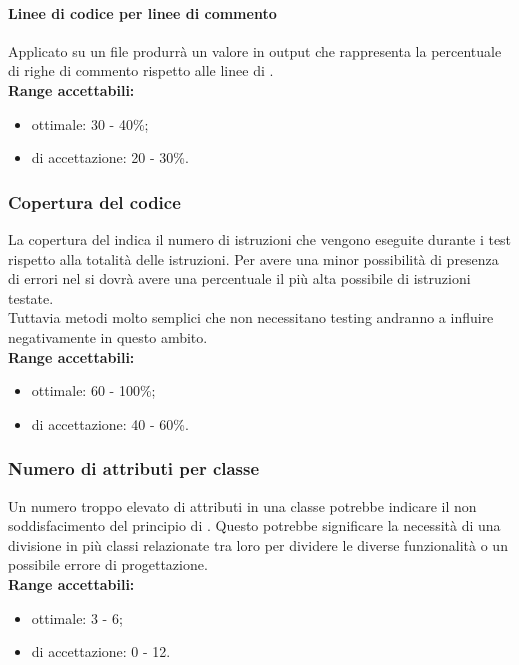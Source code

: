 \documentclass{scalatekids-article}
\begin{document}
\paragraph{Linee di codice per linee di commento}
Applicato su un file produrrà un valore in output che rappresenta la percentuale di righe di commento rispetto alle linee di .\\
\textbf{Range accettabili:}
\begin{itemize}
  \item {} ottimale: 30 - 40\%;
  \item {} di accettazione: 20 - 30\%.
\end{itemize}
\subsubsection{Copertura del codice}
La copertura del  indica il numero di istruzioni che vengono eseguite durante i test rispetto alla totalità delle istruzioni. Per avere una minor possibilità di presenza di errori nel  si dovrà avere una percentuale il più alta possibile di istruzioni testate.\\Tuttavia metodi molto semplici che non necessitano testing andranno a influire negativamente in questo ambito.\\
\textbf{Range accettabili:}
\begin{itemize}
  \item {} ottimale: 60 - 100\%;
  \item {} di accettazione: 40 - 60\%.
\end{itemize}
\subsubsection{Numero di attributi per classe}
Un numero troppo elevato di attributi in una classe potrebbe indicare il non soddisfacimento del principio di \textit{}. Questo potrebbe significare la necessità di una divisione in più classi relazionate tra loro per dividere le diverse funzionalità o un possibile errore di progettazione.\\
\textbf{Range accettabili:}
\begin{itemize}
  \item {} ottimale: 3 - 6;
  \item {} di accettazione: 0 - 12.
\end{itemize}
\end{document}
